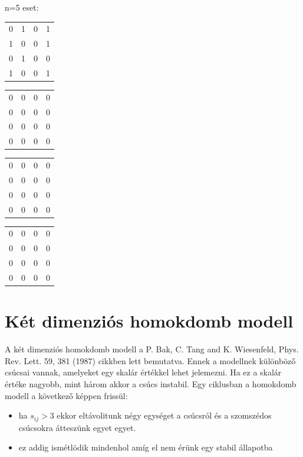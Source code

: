 \documentclass[paper=a4, fontsize=11pt]{article}
\begin{document}
n=5 eset:
\begin{tabular}{cccc}
0&1&0&1\\
1&0&0&1\\
0&1&0&0\\
1&0&0&1
\end{tabular}
\quad
\begin{tabular}{cccc}
0&0&0&0\\
0&0&0&0\\
0&0&0&0\\
0&0&0&0
\end{tabular}
\quad
\begin{tabular}{cccc}
0&0&0&0\\
0&0&0&0\\
0&0&0&0\\
0&0&0&0
\end{tabular}
\quad
\begin{tabular}{cccc}
0&0&0&0\\
0&0&0&0\\
0&0&0&0\\
0&0&0&0
\end{tabular}





\newpage
\section{Két dimenziós homokdomb modell}


A két dimenziós homokdomb modell a P. Bak, C. Tang and K. Wiesenfeld, Phys. Rev. Lett. 59, 381 (1987) cikkben lett bemutatva. Ennek a modellnek különböző csúcsai vannak, amelyeket egy skalár értékkel lehet jelemezni. Ha ez a skalár értéke nagyobb, mint három akkor a csúcs instabil. Egy ciklusban a homokdomb modell a következő képpen frissül:
\begin{itemize}
\item ha $s_{ij}>3$ ekkor eltávolitunk négy egységet a csúcsról és a szomszédos csúcsokra átteszünk egyet egyet. 
\item ez addig ismétlödik mindenhol amíg el nem érünk egy stabil állapotba
\end{itemize}
\end{document}

